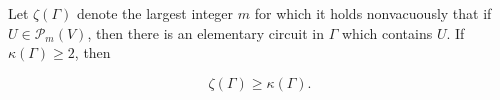 Let $\zeta(\Gamma)$ denote the largest integer $m$ for which it holds nonvacuously that if $U \in \mathcal{P}_m(V)$, then there is an elementary circuit in $\Gamma$ which contains $U$. If $\kappa(\Gamma) \geq 2$, then

$$\zeta(\Gamma) \geq \kappa(\Gamma).$$
